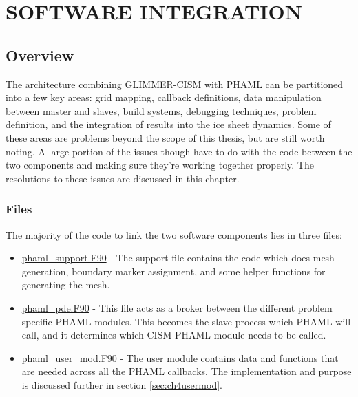 \section{SOFTWARE INTEGRATION \label{ch:softintegration}}

\subsection{Overview}\label{sec:ch4over}

The architecture combining GLIMMER-CISM with PHAML can be partitioned into a few key areas:  grid mapping, callback definitions, data manipulation between master and slaves, build systems, debugging techniques, problem definition, and the integration of results into the ice sheet dynamics.  Some of these areas are problems beyond the scope of this thesis, but are still worth noting.  A large portion of the issues though have to do with the code between the two components and making sure they're working together properly.  The resolutions to these issues are discussed in this chapter.

\subsubsection{Files}

The majority of the code to link the two software components lies in three files: 

\begin{itemize}
\item \href{http://svn.berlios.de/svnroot/repos/glimmer-cism/glimmer-cism2/libphaml/phaml\_support.F90}{phaml\_support.F90} - The support file contains the code which does mesh generation, boundary marker assignment, and some helper functions for generating the mesh.
\item \href{http://svn.berlios.de/svnroot/repos/glimmer-cism/glimmer-cism2/libphaml/phaml\_pde.F90}{phaml\_pde.F90} - This file acts as a broker between the different problem specific PHAML modules.  This becomes the slave process which PHAML will call, and it determines which CISM PHAML module needs to be called.
\item \href{http://svn.berlios.de/svnroot/repos/glimmer-cism/glimmer-cism2/libphaml/phaml\_user\_mod.F90}{phaml\_user\_mod.F90} - The user module contains data and functions that are needed across all the PHAML callbacks.  The implementation and purpose is discussed further in section \ref{sec:ch4usermod}.
\end{itemize}

